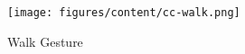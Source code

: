 \begin{figure}
	[h] \centering 
	\texttt{[image: figures/content/cc-walk.png]} \caption{Walk Gesture} \label{fg:cc:walk} 
\end{figure}
